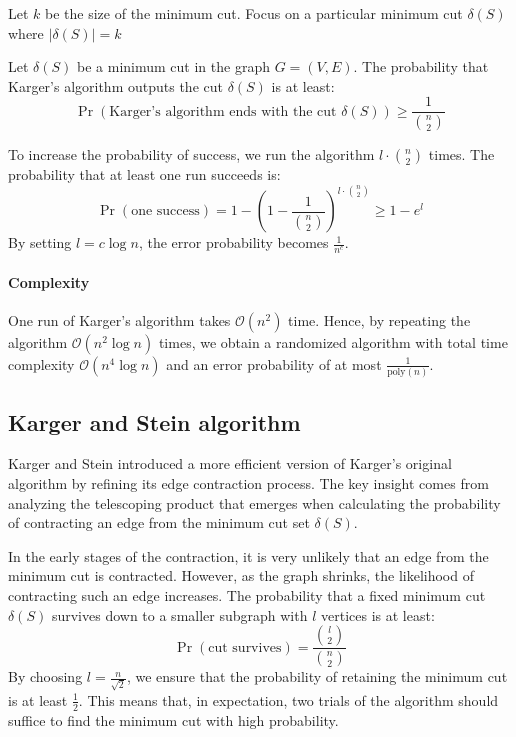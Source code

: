 Let $k$ be the size of the minimum cut. 
Focus on a particular minimum cut $\delta(S)$ where $|\delta(S)|=k$
\begin{lemma}
    Let $\delta(S)$ be a minimum cut in the graph $G=(V,E)$. 
    The probability that Karger's algorithm outputs the cut $\delta(S)$ is at least:
    \[\Pr(\text{Karger's algorithm ends with the cut }\delta(S))\geq\dfrac{1}{\binom{n}{2}}\]
\end{lemma}

To increase the probability of success, we run the algorithm $l\cdot \binom{n}{2}$ times. 
The probability that at least one run succeeds is:
\[\Pr(\text{one success})=1-\left(1-\dfrac{1}{\binom{n}{2}}\right)^{l\cdot\binom{n}{2}}\geq 1-e^l\]
By setting $l = c \log n$, the error probability becomes $\frac{1}{n^c}$. 

\paragraph*{Complexity}
One run of Karger's algorithm takes $\mathcal{O}(n^2)$ time.
Hence, by repeating the algorithm $\mathcal{O}(n^2\log n)$ times, we obtain a randomized algorithm with total time complexity $\mathcal{O}(n^4\log n)$ and an error probability of at most $\frac{1}{\text{poly}(n)}$.

\subsection{Karger and Stein algorithm}
Karger and Stein introduced a more efficient version of Karger's original algorithm by refining its edge contraction process.
The key insight comes from analyzing the telescoping product that emerges when calculating the probability of contracting an edge from the minimum cut set $\delta(S)$. 

In the early stages of the contraction, it is very unlikely that an edge from the minimum cut is contracted. 
However, as the graph shrinks, the likelihood of contracting such an edge increases. 
The probability that a fixed minimum cut $\delta(S)$ survives down to a smaller subgraph with $l$ vertices is at least:
\[\Pr(\text{cut survives})=\frac{\binom{l}{2}}{\binom{n}{2}}\]
By choosing $l=\frac{n}{\sqrt{2}}$, we ensure that the probability of retaining the minimum cut is at least $\frac{1}{2}$.
This means that, in expectation, two trials of the algorithm should suffice to find the minimum cut with high probability.

